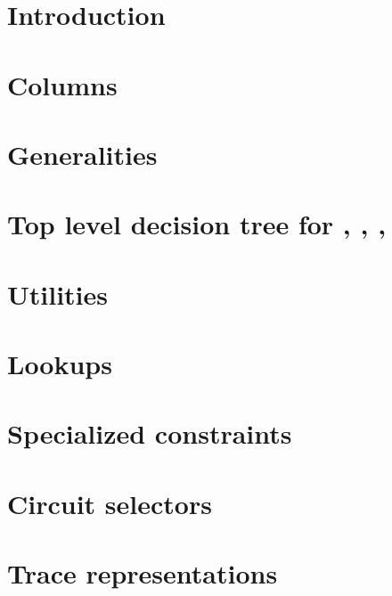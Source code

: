 \section{Introduction}     \label{bls: intro}            
\section{Columns}          \label{bls: columns}          
\section{Generalities}     \label{bls: generalities}     

\section{Top level decision tree for \malformedDataInternalTot{}, \malformedDataExternalTot{}, \wellformedDataTrivial{}, \wellformedDataNontrivial{}}     \label{bls: top level}                                          


\section{Utilities}                       \label{bls: utilities}                       
\section{Lookups}                         \label{bls: lookups}                         
\section{Specialized constraints}         \label{bls: specialized constraints}         
\section{Circuit selectors}               \label{bls: circuit selectors}               
\section{Trace representations}           \label{bls: trace representations}           
